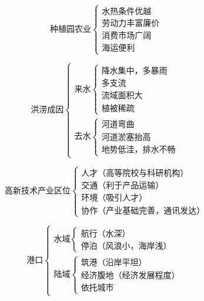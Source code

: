 \documentclass[UTF8]{ctexart}
\begin{document}
\begin{multicols}{2}
    
    \[
        \textbf{种植园农业}
        \begin{cases}
            \text{水热条件优越}\\
            \text{劳动力丰富廉价}\\
            \text{消费市场广阔}\\
            \text{海运便利}
        \end{cases}
    \]

    \[
        \textbf{洪涝成因}
        \begin{cases}
            \text{来水}
            \begin{cases}
                \text{降水集中，多暴雨}\\
                \text{多支流}\\
                \text{流域面积大}\\
                \text{植被稀疏}
            \end{cases}\\
            \text{去水}
            \begin{cases}
                \text{河道弯曲}\\
                \text{河道淤塞抬高}\\
                \text{地势低洼，排水不畅}
            \end{cases}
        \end{cases}
    \]

\end{multicols}

\newpage

\begin{multicols}{2}

    \[
        \textbf{高新技术产业区位}
        \begin{cases}
            \text{人才（高等院校与科研机构）}\\
            \text{交通（利于产品运输）}\\
            \text{环境（吸引人才）}\\
            \text{协作（产业基础完善，通讯发达）}
        \end{cases}
    \]

    \[
        \textbf{港口}
        \begin{cases}
            \text{水域}
            \begin{cases}
                \text{航行（水深）}\\
                \text{停泊（风浪小，海岸浅）}
            \end{cases}\\
            \text{陆域}
            \begin{cases}
                \text{筑港（沿岸平坦）}\\
                \text{经济腹地（经济发展程度）}\\
                \text{依托城市}
            \end{cases}
        \end{cases}
    \]

\end{multicols}
\end{document}
